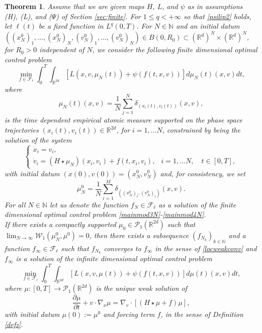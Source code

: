 \documentclass[11pt]{article}
\theoremstyle{plain}
\newtheorem{theorem}{Theorem}[section]
\theoremstyle{definition}
\theoremstyle{remark}
\numberwithin{equation}{section}
\begin{document}
\begin{theorem}\label{thm:7}
Assume that we are given maps $H$, $L$, and $\psi$ as in assumptions (H), (L), and ($\Psi$) of Section \ref{sec:finite}. For $1\le q<+\infty$ so that \eqref{psilip2} holds, let $\ell(t)$ be a fixed function in $L^q(0,T)$. For $N\in \mathbb N$ and an initial datum $((x_N^0)_1, \dots, (x_N^0)_N, (v_N^0)_1, \dots, (v_N^0)_N) \in B(0,R_0) \subset (\mathbb R^d)^N \times (\mathbb R^d)^N$,
for $R_0>0$ independent of $N$,  we consider the following finite dimensional optimal control problem
\begin{equation}\label{mainmod3N}
\min_{f \in \mathcal F_\ell} \int_{0}^T \int_{\mathbb R^{2d}} \left [ L(x,v,\mu_N(t)) + \psi( f(t,x,v)) \right ] d \mu_N(t)(x,v) dt,
\end{equation}
where 
$$
\mu_N(t)(x,v) = \frac{1}{N} \sum_{j=1}^N \delta_{(x_i(t),v_i(t))}(x,v),
$$
is the time dependent empirical atomic measure supported on the phase space trajectories $(x_i(t),v_i(t)) \in \mathbb R^{2 d}$, for $i=1,\dots N$, constrained by being the solution 
of the system
\begin{equation}\label{mainmod4N}
\left \{
\begin{array}{ll}
\dot x_i = v_i, & \\
\dot v_i = ( H \star \mu_N)(x_i,v_i) + f(t,x_i,v_i), & i=1,\dots N, \quad t \in [0,T],
\end{array}
\right.
\end{equation}
with initial datum $(x(0),v(0))=(x_N^0,v_N^0)$ and, for consistency, we set $$\mu_N^0 = \frac{1}{N} \sum_{i=1}^M \delta_{((x_N^0)_i,(v_N^0)_i)}(x,v).$$
For all $N \in \mathbb N$ let us denote the function $f_N \in \mathcal F_\ell$ as a solution of the finite dimensional optimal control problem \eqref{mainmod3N}-\eqref{mainmod4N}.
\\
If there exists a  compactly supported $\mu_0 \in \mathcal P_1(\mathbb R^{2d})$ such that $\lim_{N \to \infty} \mathcal W_1(\mu_N^0,\mu^0)=0$, then there exists a
subsequence $(f_{N_k})_{k \in \mathbb N}$ and a function $f_\infty \in \mathcal F_\ell$ such that $f_{N_k}$ converges to $f_\infty$ in the sense of \eqref{locweakconv} and $f_\infty$ is a solution of the infinite dimensional optimal control problem
\begin{equation}\label{mainmod3oo}
\min_{f \in \mathcal F_\ell} \int_{0}^T \int_{\mathbb R^{2d}} \left [ L(x,v,\mu(t)) + \psi(f(t,x,v)) \right ] d \mu(t)(x,v) dt,
\end{equation}
where $\mu:[0,T]  \to \mathcal P_1(\mathbb R^{2d})$ is the unique weak solution of 
\begin{equation}\label{PDEmodXXoo}
\frac{\partial \mu}{\partial t} + v \cdot \nabla_x \mu = \nabla_v \cdot \left [ \left ( H \star \mu + f \right ) \mu \right ],
\end{equation}
with initial datum $\mu(0):=\mu^0$ and forcing term $f$, in the sense of Definition \ref{defz}.
\end{theorem}
\end{document}
